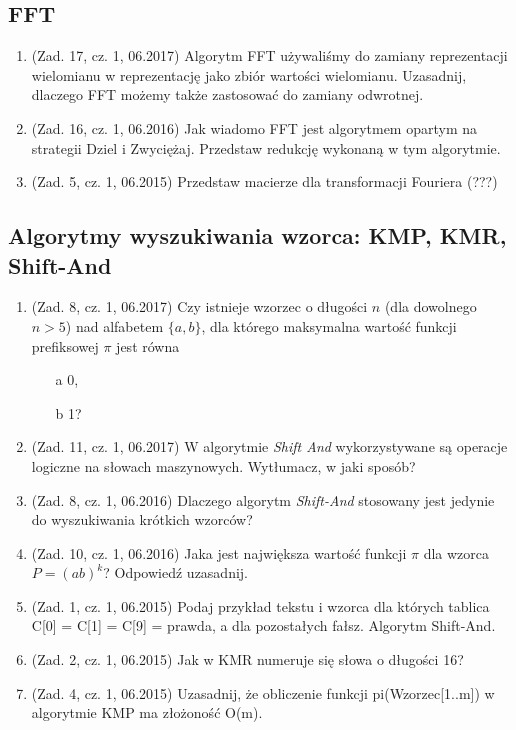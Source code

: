 \documentclass[10pt]{article}%
\begin{document}
\subsection*{FFT}

\begin{enumerate}

\item (Zad. 17, cz. 1, 06.2017) Algorytm FFT używaliśmy do zamiany reprezentacji wielomianu w reprezentację jako zbiór wartości wielomianu. Uzasadnij, dlaczego FFT możemy także zastosować do zamiany odwrotnej.

\item (Zad. 16, cz. 1, 06.2016) Jak wiadomo FFT jest algorytmem opartym na strategii Dziel i Zwyciężaj. Przedstaw redukcję wykonaną w tym algorytmie.

\item (Zad. 5, cz. 1, 06.2015) Przedstaw macierze dla transformacji Fouriera (???)

\end{enumerate}


\subsection*{Algorytmy wyszukiwania wzorca: KMP, KMR, Shift-And}

\begin{enumerate}

\item (Zad. 8, cz. 1, 06.2017) Czy istnieje wzorzec o długości $n$ (dla dowolnego $n>5$) nad alfabetem $\{a,b\}$, dla którego maksymalna wartość funkcji prefiksowej $\pi$ jest równa 
\begin{itemize}
\item[a] 0,
\item[b] 1?
\end{itemize}

\item (Zad. 11, cz. 1, 06.2017) W algorytmie \emph{Shift And} wykorzystywane są operacje logiczne na słowach maszynowych. Wytłumacz, w jaki sposób?

\item (Zad. 8, cz. 1, 06.2016) Dlaczego algorytm \textit{Shift-And} stosowany jest jedynie do wyszukiwania krótkich wzorców?

\item (Zad. 10, cz. 1, 06.2016) Jaka jest największa wartość funkcji $\pi$ dla wzorca $ P = (ab)^k$? Odpowiedź uzasadnij.

\item (Zad. 1, cz. 1, 06.2015) Podaj przykład tekstu i wzorca dla których tablica C[0] = C[1] = C[9] = prawda, a dla pozostałych fałsz. Algorytm Shift-And.

\item (Zad. 2, cz. 1, 06.2015) Jak w KMR numeruje się słowa o długości 16?

\item (Zad. 4, cz. 1, 06.2015) Uzasadnij, że obliczenie funkcji pi(Wzorzec[1..m]) w algorytmie KMP ma złożoność O(m).

\end{enumerate}
\end{document}
